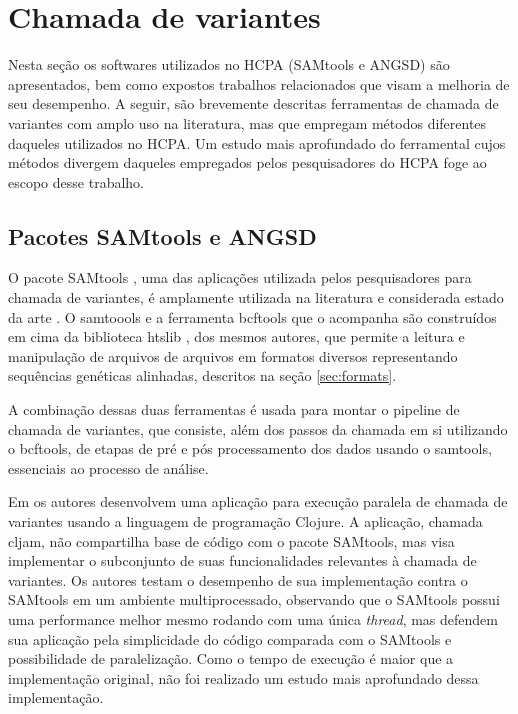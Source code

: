 \documentclass[cic,tc]{iiufrgs}
\begin{document}
\section{Chamada de variantes}

Nesta seção os softwares utilizados no HCPA (SAMtools e ANGSD) são
apresentados, bem como expostos trabalhos relacionados que visam a melhoria de
seu desempenho. A seguir, são brevemente descritas ferramentas de chamada de
variantes com amplo uso na literatura, mas que empregam métodos diferentes
daqueles utilizados no HCPA. Um estudo mais aprofundado do ferramental cujos
métodos divergem daqueles empregados pelos pesquisadores do HCPA foge ao escopo
desse trabalho.

\subsection{Pacotes SAMtools e ANGSD}

O pacote SAMtools \cite{li2009sequence}, uma das aplicações utilizada pelos
pesquisadores para chamada de variantes, é amplamente utilizada na literatura
\cite{danecek2021twelve} e considerada estado da arte \cite{yao2020evaluation}.
O samtoools e a ferramenta bcftools que o acompanha são construídos em cima da
biblioteca htslib \cite{bonfield2021htslib}, dos mesmos autores, que permite a
leitura e manipulação de arquivos de arquivos em formatos diversos
representando sequências genéticas alinhadas, descritos na seção
\ref{sec:formats}.

A combinação dessas duas ferramentas é usada para montar o pipeline de chamada
de variantes, que consiste, além dos passos da chamada em si utilizando o
bcftools, de etapas de pré e pós processamento dos dados usando o samtools,
essenciais ao processo de análise.

Em \cite{takeuchi2016cljam} os autores desenvolvem uma aplicação para execução
paralela de chamada de variantes usando a linguagem de programação Clojure. A
aplicação, chamada cljam, não compartilha base de código com o pacote SAMtools,
mas visa implementar o subconjunto de suas funcionalidades relevantes à
chamada de variantes. Os autores testam o desempenho de sua implementação
contra o SAMtools em um ambiente multiprocessado, observando que o SAMtools
possui uma performance melhor mesmo rodando com uma única \textit{thread}, mas defendem
sua aplicação pela simplicidade do código comparada com o SAMtools e
possibilidade de paralelização. Como o tempo de execução é maior que a
implementação original, não foi realizado um estudo mais aprofundado dessa
implementação.
\end{document}
